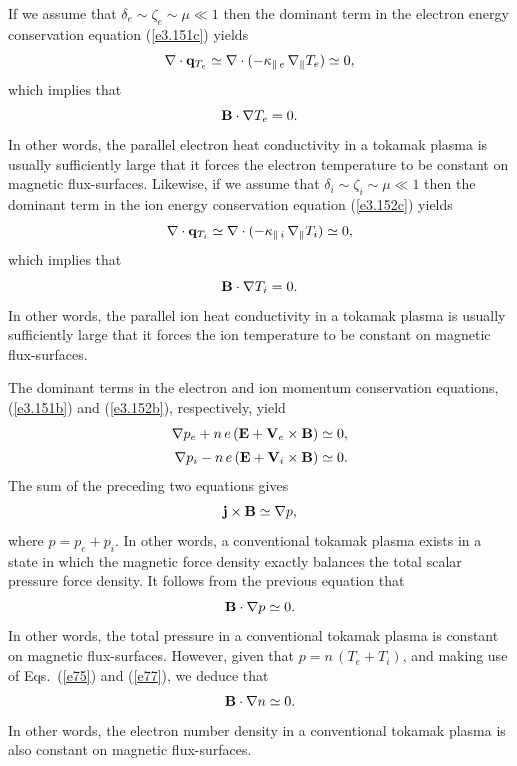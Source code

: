 \documentclass[notitlepage,12pt]{article}
\begin{document}
If we assume that $\delta_e\sim \zeta_e\sim \mu\ll 1$ then the dominant term in the electron energy conservation equation
(\ref{e3.151c}) yields
\begin{equation}
\nabla\cdot{\bf q}_{T_e}\simeq \nabla\cdot(-\kappa_{\parallel\,e}\,\nabla_\parallel T_e)\simeq 0,
\end{equation}
which implies that 
\begin{equation}
{\bf B}\cdot\nabla T_e=0. \label{e75}
\end{equation}
In other words, the parallel electron heat conductivity in a tokamak plasma is usually
sufficiently large that it forces the electron temperature to be constant on magnetic flux-surfaces. 
Likewise, if we assume that $\delta_i\sim \zeta_i\sim \mu\ll 1$ then the dominant term in the ion energy conservation equation
(\ref{e3.152c}) yields
\begin{equation}
\nabla\cdot{\bf q}_{T_i}\simeq \nabla\cdot(-\kappa_{\parallel\,i}\,\nabla_\parallel T_i)\simeq 0,
\end{equation}
which implies that 
\begin{equation}
{\bf B}\cdot\nabla T_i=0.\label{e77}
\end{equation}
In other words, the parallel ion heat conductivity in a tokamak plasma is usually
sufficiently large that it forces the ion temperature to be constant on magnetic flux-surfaces. 

 The dominant terms in the electron and ion momentum conservation equations,
(\ref{e3.151b}) and (\ref{e3.152b}), respectively, yield
\begin{align}\label{e78}
\nabla p_e + n\,e\,({\bf E}+{\bf V}_e\times {\bf B}) &\simeq 0,\\[0.5ex]
\nabla p_i - n\,e\,({\bf E}+{\bf V}_i\times {\bf B}) &\simeq 0.\label{e79}
\end{align}
The sum of the preceding two equations gives
\begin{equation}\label{e80}
 {\bf j}\times {\bf B} \simeq\nabla p,
\end{equation}
where $p=p_e+p_i$. In other words, a conventional tokamak plasma exists in a state in which the magnetic force density exactly balances the  total scalar pressure force density. 
It follows from the previous equation that 
\begin{equation}\label{e81}
{\bf B}\cdot\nabla p\simeq 0.
\end{equation}
In other words, the total pressure in a conventional tokamak plasma is constant on magnetic flux-surfaces. 
 However, given that $p=n\,(T_e+T_i)$, and making use of Eqs.~(\ref{e75}) and (\ref{e77}), we deduce that 
\begin{equation}
{\bf B}\cdot\nabla n\simeq 0.
\end{equation}
In other words, the electron number density in a conventional tokamak plasma is also  constant on
magnetic flux-surfaces. 
\end{document}
